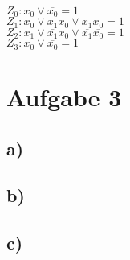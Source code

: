 \documentclass{article}
\begin{document}
		$Z_0: x_0\vee \overline{x_0}=1$ \\
		$Z_1: \overline{x_0} \vee x_1x_0 \vee \overline{x_1}x_0 =1 $ \\
		$Z_2: x_1\vee\overline{x_1}x_0\vee \overline{x_1}\overline{x_0}=1$ \\
		$Z_3: x_0\vee \overline{x_0}=1$

\section*{Aufgabe 3}

	\subsection*{a)}
	\subsection*{b)}
	\subsection*{c)}
\end{document}
